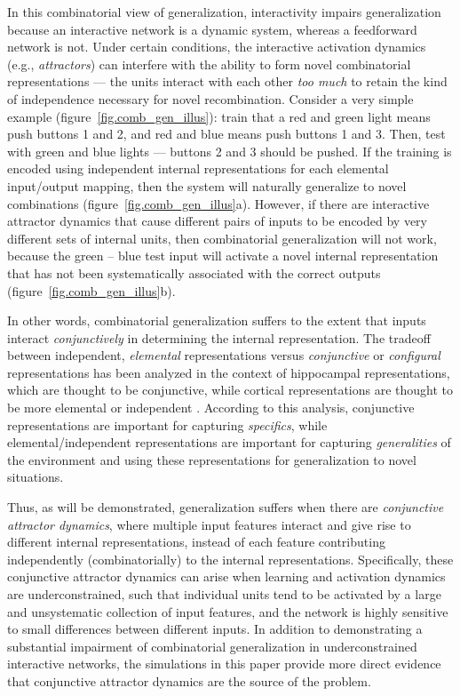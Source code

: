 \documentclass[12pt,twoside]{article}
\begin{document}
In this combinatorial view of generalization, interactivity impairs
generalization because an interactive network is a dynamic system,
whereas a feedforward network is not.  Under certain conditions, the
interactive activation dynamics (e.g., {\em attractors}) can interfere
with the ability to form novel combinatorial representations --- the
units interact with each other {\em too much} to retain the kind of
independence necessary for novel recombination.  Consider a very
simple example (figure~\ref{fig.comb_gen_illus}): train that a red and
green light means push buttons 1 and 2, and red and blue means push
buttons 1 and 3.  Then, test with green and blue lights --- buttons 2
and 3 should be pushed.  If the training is encoded using independent
internal representations for each elemental input/output mapping, then
the system will naturally generalize to novel combinations
(figure~\ref{fig.comb_gen_illus}a).  However, if there are interactive
attractor dynamics that cause different pairs of inputs to be encoded
by very different sets of internal units, then combinatorial
generalization will not work, because the green -- blue test input
will activate a novel internal representation that has not been
systematically associated with the correct outputs
(figure~\ref{fig.comb_gen_illus}b).

In other words, combinatorial generalization suffers to the extent
that inputs interact {\em conjunctively} in determining the internal
representation.  The tradeoff between independent, {\em elemental}
representations versus {\em conjunctive} or {\em configural}
representations has been analyzed in the context of hippocampal
representations, which are thought to be conjunctive, while cortical
representations are thought to be more elemental or independent
\cite[e.g.,]{Marr71,OReillyMcClelland94,McClellandMcNaughtonOReilly95,OReillyRudy00,OReillyRudy00hip}.
According to this analysis, conjunctive representations are important
for capturing {\em specifics}, while elemental/independent
representations are important for capturing {\em generalities} of the
environment and using these representations for generalization to
novel situations.

Thus, as will be demonstrated, generalization suffers when there are
{\em conjunctive attractor dynamics}, where multiple input features
interact and give rise to different internal representations, instead
of each feature contributing independently (combinatorially) to the
internal representations.  Specifically, these conjunctive attractor
dynamics can arise when learning and activation dynamics are
underconstrained, such that individual units tend to be activated by a
large and unsystematic collection of input features, and the network
is highly sensitive to small differences between different inputs.  In
addition to demonstrating a substantial impairment of combinatorial
generalization in underconstrained interactive networks, the
simulations in this paper provide more direct evidence that
conjunctive attractor dynamics are the source of the problem.
\end{document}
